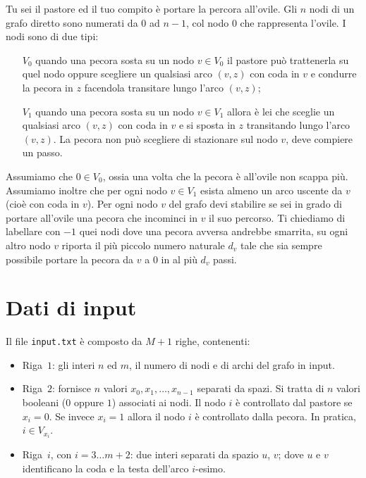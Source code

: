 \renewcommand{\nomebreve}{attract}
\renewcommand{\titolo}{Portare le pecore all'ovile}

\introduzione

Tu sei il pastore ed il tuo compito è portare la percora all'ovile.
Gli $n$ nodi di un grafo diretto sono numerati da $0$ ad $n-1$,
col nodo $0$ che rappresenta l'ovile.
I nodi sono di due tipi:
\begin{itemize}
\item[$V_0$] quando una pecora sosta su un nodo $v\in V_0$
  il pastore può trattenerla su quel nodo
  oppure scegliere un qualsiasi arco $(v,z)$ con coda in $v$
  e condurre la pecora in $z$ facendola transitare lungo l'arco $(v,z)$;
\item[$V_1$] quando una pecora sosta su un nodo $v\in V_1$
  allora è lei che sceglie un qualsiasi arco $(v,z)$ con coda in $v$
  e si sposta in $z$ transitando lungo l'arco $(v,z)$. La pecora non può scegliere di stazionare sul nodo $v$, deve compiere un passo.
\end{itemize}

Assumiamo che $0\in V_0$, ossia una volta che la pecora è all'ovile non scappa più. Assumiamo inoltre che per ogni nodo $v\in V_1$ esista almeno un arco uscente da $v$ (cioè con coda in $v$).
Per ogni nodo $v$ del grafo devi stabilire se sei in grado di portare all'ovile una pecora che incominci in $v$ il suo percorso.
Ti chiediamo di labellare con $-1$ quei nodi dove una pecora avversa andrebbe smarrita, su ogni altro nodo $v$ riporta il più piccolo numero naturale $d_v$
tale che sia sempre possibile portare la pecora da $v$ a $0$ in al più $d_v$ passi.

\section*{Dati di input}
Il file \verb'input.txt' è composto da $M+1$ righe, contenenti:
\begin{itemize}[nolistsep,itemsep=2mm]
\item Riga~$1$: gli interi $n$ ed $m$, il numero di nodi e di archi del grafo in input.
\item Riga~$2$: fornisce $n$ valori $x_0, x_1, \ldots, x_{n-1}$  separati da spazi. Si tratta di $n$ valori booleani ($0$ oppure $1$) associati ai nodi. Il nodo $i$ è controllato dal pastore se $x_i=0$. Se invece $x_i=1$ allora il nodo $i$ è controllato dalla pecora. In pratica, $i\in V_{x_{i}}$.
\item Riga~$i$, con $i=3\ldots m+2$: due interi separati da spazio $u$, $v$; dove $u$ e $v$ identificano la coda e la testa dell'arco $i$-esimo.
\end{itemize}


